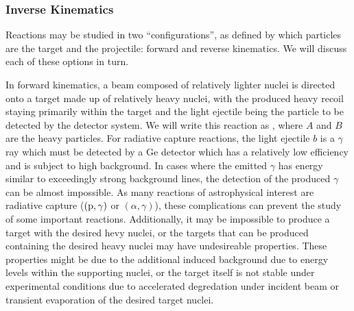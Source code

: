 \subsubsection{Inverse Kinematics}


Reactions may be studied in two ``configurations'', as defined by which
particles are the target and the projectile: forward and reverse
kinematics. We will discuss each of these options in turn.

In forward kinematics, a beam composed of relatively lighter nuclei
is directed onto a target made up of relatively heavy nuclei, with the produced
heavy recoil staying primarily within the target and the light ejectile being
the particle to be detected by the detector system. We will write this reaction
as , where $A$ and $B$ are the heavy particles. For radiative
capture reactions, the light ejectile $b$ is a $\gamma$ ray which must be
detected by a Ge detector which has a relatively low efficiency and is subject
to high background. In cases where the emitted $\gamma$ has energy similar to
exceedingly strong background lines, the detection of the produced $\gamma$ can
be almost impossible. As many reactions of astrophysical interest are radiative
capture ($(\rm{p},\gamma)$ or $(\alpha,\gamma)$), these complications can
prevent the study of some important reactions. Additionally, it may be
impossible to produce a target with the desired hevy nuclei, or the targets
that can be produced containing the desired heavy nuclei may have undesireable
properties. These properties might be due to the additional induced background
due to energy levels within the supporting nuclei, or the target itself is not
stable under experimental conditions due to accelerated degredation under
incident beam or transient evaporation of the desired target nuclei.


